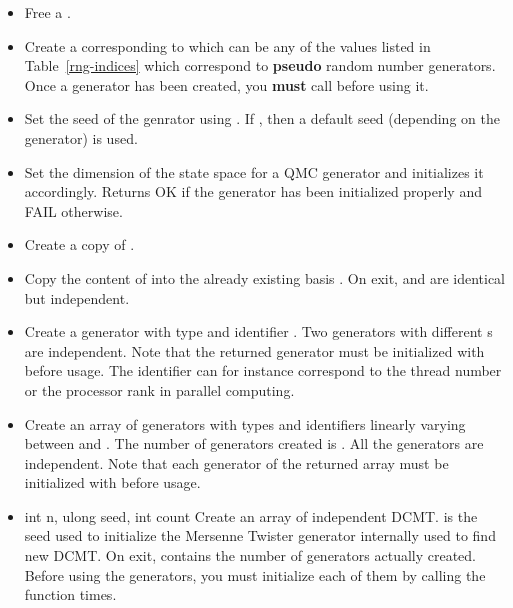 \begin{itemize}
\item {}
  \sshortdescribe Free a \PnlRng.
\item {}
  \sshortdescribe Create a \PnlRng corresponding to 
  which can be any of the values  listed in
  Table~\ref{rng-indices} which correspond to {\bf pseudo} random number generators.
  Once a generator has been created, you {\bf must} call
   before using it. 
\item {}
  \sshortdescribe Set the seed of the genrator  using . If
  , then a default seed (depending on the generator) is used.
\item {}
  \sshortdescribe Set the dimension of the state space for a QMC generator and
  initializes it accordingly.  Returns OK if the generator has been initialized
  properly and FAIL otherwise.
\item {}
  \sshortdescribe Create a copy of .
\item {}
  \sshortdescribe Copy the content of  into the already existing
  basis . On exit,  and  are identical but
  independent. 
\item {}
  \sshortdescribe Create a generator with type  and identifier
  . Two generators with different s are independent. Note that
  the returned generator must be initialized with  before
  usage. The identifier  can for instance correspond to the thread
  number or the processor rank in parallel computing.
\item {}
  \sshortdescribe Create an array of generators with types 
  and identifiers linearly varying between  and . The
  number of generators created is . All the
  generators are independent. Note that each generator of the returned array
  must be initialized with  before usage.
\item {}
  {int n, ulong seed, int \ptr count}
  \sshortdescribe Create an array of  independent DCMT.  is
  the seed used to initialize the Mersenne Twister generator internally used to
  find new DCMT. On exit,  contains the number of generators actually
  created. Before using the generators, you must initialize each of them by calling the
  function   times.
\end{itemize}

